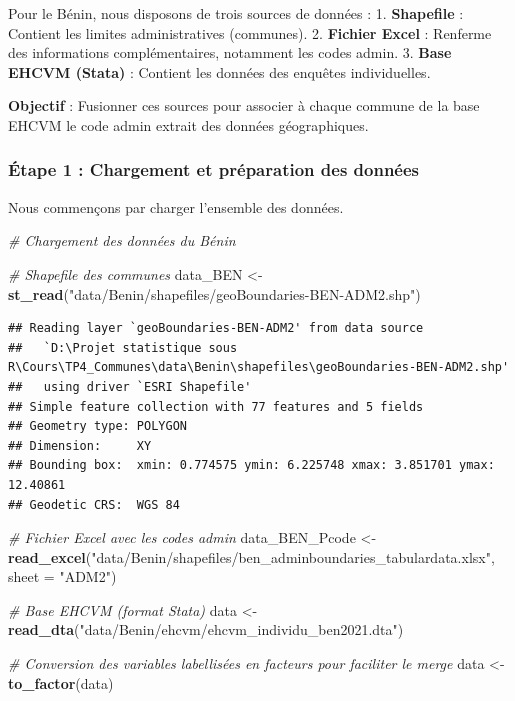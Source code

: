 \documentclass[
]{article}
\newenvironment{Shaded}{\begin{snugshade}}{\end{snugshade}}
\newcommand{\AttributeTok}[1]{\textcolor[rgb]{0.13,0.29,0.53}{#1}}
\newcommand{\CommentTok}[1]{\textcolor[rgb]{0.56,0.35,0.01}{\textit{#1}}}
\newcommand{\FunctionTok}[1]{\textcolor[rgb]{0.13,0.29,0.53}{\textbf{#1}}}
\newcommand{\NormalTok}[1]{#1}
\newcommand{\OtherTok}[1]{\textcolor[rgb]{0.56,0.35,0.01}{#1}}
\newcommand{\StringTok}[1]{\textcolor[rgb]{0.31,0.60,0.02}{#1}}
\begin{document}
Pour le Bénin, nous disposons de trois sources de données : 1.
\textbf{Shapefile} : Contient les limites administratives (communes). 2.
\textbf{Fichier Excel} : Renferme des informations complémentaires,
notamment les codes admin. 3. \textbf{Base EHCVM (Stata)} : Contient les
données des enquêtes individuelles.

\textbf{Objectif} : Fusionner ces sources pour associer à chaque commune
de la base EHCVM le code admin extrait des données géographiques.

\hypertarget{uxe9tape-1-chargement-et-pruxe9paration-des-donnuxe9es}{%
\subsubsection{Étape 1 : Chargement et préparation des
données}\label{uxe9tape-1-chargement-et-pruxe9paration-des-donnuxe9es}}

Nous commençons par charger l'ensemble des données.

\begin{Shaded}
\begin{Highlighting}[]
\CommentTok{\# Chargement des données du Bénin}

\CommentTok{\# Shapefile des communes}
\NormalTok{data\_BEN }\OtherTok{\textless{}{-}} \FunctionTok{st\_read}\NormalTok{(}\StringTok{"data/Benin/shapefiles/geoBoundaries{-}BEN{-}ADM2.shp"}\NormalTok{)}
\end{Highlighting}
\end{Shaded}

\begin{verbatim}
## Reading layer `geoBoundaries-BEN-ADM2' from data source 
##   `D:\Projet statistique sous R\Cours\TP4_Communes\data\Benin\shapefiles\geoBoundaries-BEN-ADM2.shp' 
##   using driver `ESRI Shapefile'
## Simple feature collection with 77 features and 5 fields
## Geometry type: POLYGON
## Dimension:     XY
## Bounding box:  xmin: 0.774575 ymin: 6.225748 xmax: 3.851701 ymax: 12.40861
## Geodetic CRS:  WGS 84
\end{verbatim}

\begin{Shaded}
\begin{Highlighting}[]
\CommentTok{\# Fichier Excel avec les codes admin}
\NormalTok{data\_BEN\_Pcode }\OtherTok{\textless{}{-}} \FunctionTok{read\_excel}\NormalTok{(}\StringTok{"data/Benin/shapefiles/ben\_adminboundaries\_tabulardata.xlsx"}\NormalTok{, }
                             \AttributeTok{sheet =} \StringTok{"ADM2"}\NormalTok{)}

\CommentTok{\# Base EHCVM (format Stata)}
\NormalTok{data }\OtherTok{\textless{}{-}} \FunctionTok{read\_dta}\NormalTok{(}\StringTok{"data/Benin/ehcvm/ehcvm\_individu\_ben2021.dta"}\NormalTok{)}

\CommentTok{\# Conversion des variables labellisées en facteurs pour faciliter le merge}
\NormalTok{data }\OtherTok{\textless{}{-}} \FunctionTok{to\_factor}\NormalTok{(data)}
\end{Highlighting}
\end{Shaded}
\end{document}
